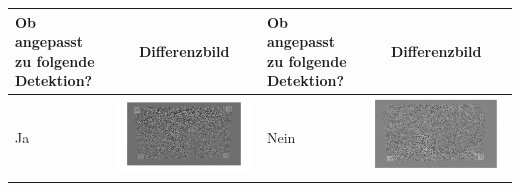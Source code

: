 \begin{table}[htb]
	\label{tbl:differenzbildformel}
	\footnotesize
	\centering
	\begin{tabular}{|p{2cm}<{\centering}|c|p{2cm}<{\centering}|c|}	%
	\toprule
	\textbf{Ob angepasst zu folgende Detektion?} & \multirow{4}{*}{\textbf{Differenzbild}} & \textbf{Ob angepasst zu folgende Detektion?} & \multirow{4}{*}{\textbf{Differenzbild}} \\
	\midrule
	 Ja & \includegraphics[scale=0.12]{images/3_Ersteverfahren/Differenzbild/0schwarz.pdf}& Nein & \includegraphics[scale=0.15]{images/3_Ersteverfahren/Differenzbild/1halfschwarz.pdf}\\

\end{tabular}
\end{table}
